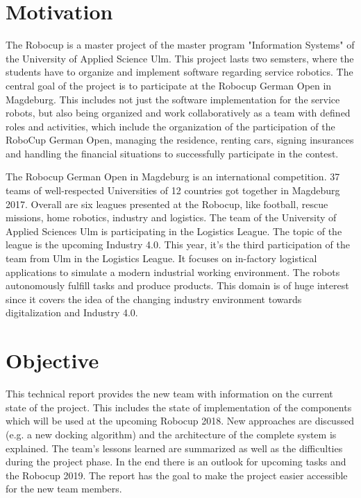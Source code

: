 \section{Motivation}

The Robocup is a master project of the master program "Information Systems" of the University of Applied Science Ulm. This project lasts two semsters, where the students have to organize and implement software regarding service robotics. The central goal of the project is to participate at the Robocup German Open in Magdeburg. This includes not just the software implementation for the service robots, but also being organized and work collaboratively as a team with defined roles and activities, which include the organization of the participation of the RoboCup German Open, managing the residence, renting cars, signing insurances and handling the financial situations to successfully participate in the contest. 

The Robocup German Open in Magdeburg is an international competition. 37 teams of well-respected Universities of 12 countries got together in Magdeburg 2017. Overall are six leagues presented at the Robocup, like football, rescue missions, home robotics, industry and logistics. The team of the University of Applied Sciences Ulm is participating in the Logistics League. The topic of the league is the upcoming Industry 4.0. This year, it's the third participation of the team from Ulm in the Logistics League. It focuses on in-factory logistical applications to simulate a modern industrial working environment. The robots autonomously fulfill tasks and produce products. This domain is of huge interest since it covers the idea of the changing industry environment towards digitalization and Industry 4.0. 

\section{Objective}

This technical report provides the new team with information on the current state of the project. This includes the state of implementation of the components which will be used at the upcoming Robocup 2018. New approaches are discussed (e.g. a new docking algorithm) and the architecture of the complete system is explained. The team's lessons learned are summarized as well as the difficulties during the project phase. In the end there is an outlook for upcoming tasks and the Robocup 2019.
The report has the goal to make the project easier accessible for the new team members.  
